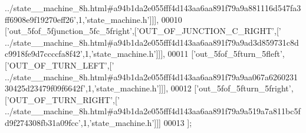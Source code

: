 \begin{DoxyCode}
{      ../state\_\_machine\_8h.html#a94b1da2e055fff4d143aa6aa891f79a9a881116d547fa3ff6908e9f19270eff26'},1,\textcolor{stringliteral}{'state\_machine.h'}]]],
00010   [\textcolor{stringliteral}{'out\_5fof\_5fjunction\_5fc\_5fright'},[\textcolor{stringliteral}{'OUT\_OF\_JUNCTION\_C\_RIGHT'},[\textcolor{stringliteral}{'
      ../state\_\_machine\_8h.html#a94b1da2e055fff4d143aa6aa891f79a9ad3d859731c8dc9918fe9d7ccccfa8f42'},1,\textcolor{stringliteral}{'state\_machine.h'}]]],
00011   [\textcolor{stringliteral}{'out\_5fof\_5fturn\_5fleft'},[\textcolor{stringliteral}{'OUT\_OF\_TURN\_LEFT'},[\textcolor{stringliteral}{'
      ../state\_\_machine\_8h.html#a94b1da2e055fff4d143aa6aa891f79a9aa067a626023130425d23479f09f6642f'},1,\textcolor{stringliteral}{'state\_machine.h'}]]],
00012   [\textcolor{stringliteral}{'out\_5fof\_5fturn\_5fright'},[\textcolor{stringliteral}{'OUT\_OF\_TURN\_RIGHT'},[\textcolor{stringliteral}{'
      ../state\_\_machine\_8h.html#a94b1da2e055fff4d143aa6aa891f79a9a519a7a811bc5fd9f274308fb31a09fcc'},1,\textcolor{stringliteral}{'state\_machine.h'}]]]
00013 ];
\end{DoxyCode}
